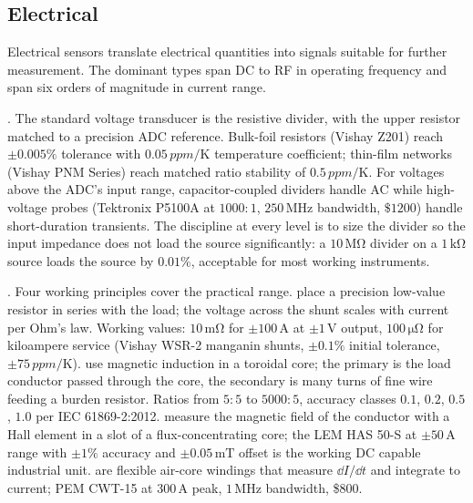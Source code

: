 \subsection{Electrical}

Electrical sensors translate electrical quantities into signals
suitable for further measurement. The dominant types span DC to
RF in operating frequency and span six orders of magnitude in
current range.

. The standard voltage transducer is the
resistive divider, with the upper resistor matched to a precision
ADC reference. Bulk-foil resistors (Vishay Z201) reach
$\pm 0.005\%$ tolerance with $0.05\,\si{ppm/\kelvin}$ temperature
coefficient; thin-film networks (Vishay PNM Series) reach matched
ratio stability of $0.5\,\si{ppm/\kelvin}$. For voltages above the
ADC's input range, capacitor-coupled dividers handle AC while
high-voltage probes (Tektronix P5100A at $1000:1$, $250\,\si{
\mega\hertz}$ bandwidth, $\$1200$) handle short-duration
transients. The discipline at every level is to size the divider
so the input impedance does not load the source significantly: a
$10\,\si{\mega\ohm}$ divider on a $1\,\si{\kilo\ohm}$ source
loads the source by $0.01\%$, acceptable for most working
instruments.

. Four working principles cover the
practical range.  place a precision
low-value resistor in series with the load; the voltage across
the shunt scales with current per Ohm's law. Working values:
$10\,\si{\milli\ohm}$ for $\pm 100\,\si{\ampere}$ at $\pm 1\,\si{
\volt}$ output, $100\,\si{\micro\ohm}$ for kiloampere service
(Vishay WSR-2 manganin shunts, $\pm 0.1\%$ initial tolerance,
$\pm 75\,\si{ppm/\kelvin}$). 
use magnetic induction in a toroidal core; the primary is the
load conductor passed through the core, the secondary is many
turns of fine wire feeding a burden resistor. Ratios from $5:5$
to $5000:5$, accuracy classes $0.1$, $0.2$, $0.5$, $1.0$ per
IEC 61869-2:2012.  measure
the magnetic field of the conductor with a Hall element in a slot
of a flux-concentrating core; the LEM HAS 50-S at $\pm 50\,\si{
\ampere}$ range with $\pm 1\%$ accuracy and $\pm 0.05\,\si{
\milli\tesla}$ offset is the working DC capable industrial unit.
 are flexible air-core windings that
measure $\dd I/\dd t$ and integrate to current; PEM CWT-15 at
$300\,\si{\ampere}$ peak, $1\,\si{\mega\hertz}$ bandwidth,
\$800.

